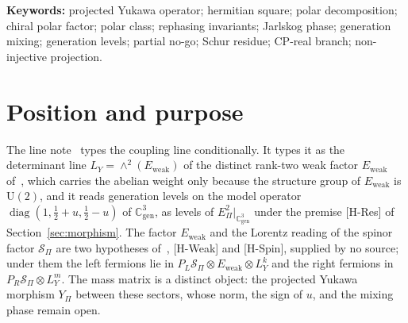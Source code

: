 \documentclass[11pt]{article}
\theoremstyle{definition}
\theoremstyle{remark}
\newcommand{\Cgen}{\mathbb{C}^{3}_{\mathrm{gen}}}
\newcommand{\Epi}{E_{\Pi}}
\newcommand{\Sbundle}{\mathcal{S}_{\Pi}}
\newcommand{\Eweak}{E_{\mathrm{weak}}}
\newcommand{\LY}{L_{Y}}
\newcommand{\Ypi}{Y_{\Pi}}
\newcommand{\UU}{\mathrm{U}}
\newcommand{\diag}{\operatorname{diag}}
\begin{document}
  \noindent\textbf{Keywords:}
  projected Yukawa operator; hermitian square; polar decomposition; chiral polar factor; polar class;
  rephasing invariants; Jarlskog phase; generation mixing; generation levels; partial no-go; Schur residue;
  CP-real branch; non-injective projection.

  \newpage

  \tableofcontents

  \newpage

  \section{Position and purpose}
    \label{sec:position}

    The line note~\cite{Beau2026pyl} types the coupling line conditionally.
    It types it as the determinant line $\LY = \wedge^{2}(\Eweak)$ of the distinct rank-two weak factor $\Eweak$
    of~\cite{Beau2026q14}, which carries the abelian weight only because the structure group of $\Eweak$ is $\UU(2)$,
    and it reads generation levels on the model operator $\diag(1, \tfrac12 + u, \tfrac12 - u)$ of $\Cgen$, as levels of
    $\Epi^{2}|_{\Cgen}$ under the premise [H-Res] of Section~\ref{sec:morphism}.
    The factor $\Eweak$ and the Lorentz reading of the spinor factor $\Sbundle$ are two hypotheses
    of~\cite{Beau2026q14}, [H-Weak] and [H-Spin], supplied by no source; under them the left fermions lie in
    $P_{L}\Sbundle \otimes \Eweak \otimes \LY^{k}$ and the right fermions in $P_{R}\Sbundle \otimes \LY^{m}$.
    The mass matrix is a distinct object: the projected Yukawa morphism $\Ypi$ between these sectors, whose norm, the
    sign of $u$, and the mixing phase remain open.
\end{document}
